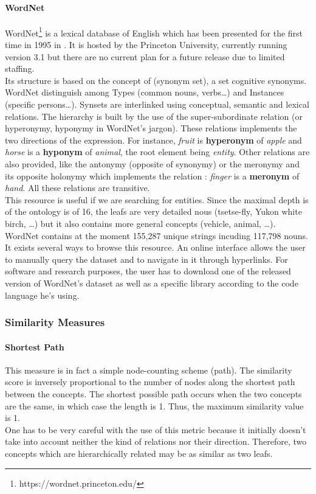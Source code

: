 \paragraph{WordNet} %
\label{par:wordnet}
WordNet\footnote{https://wordnet.princeton.edu/} is a lexical database of English which has been presented for the first time in 1995 in \cite{miller2}. It is hosted by the Princeton University, currently running version 3.1 but there are no current plan for a future release due to limited staffing.\\
Its structure is based on the concept of  (synonym set), a set cognitive synonyms. WordNet distinguish among Types (common nouns, verbs\dots) and Instances (specific persons\dots). Synsets are interlinked using conceptual, semantic and lexical relations. The hierarchy is built by the use of the super-subordinate relation (or hyperonymy, hyponymy in WordNet's jargon). These relations implements the two directions of the  expression. For instance, \textit{fruit} is \textbf{hyperonym} of \textit{apple} and \textit{horse} is a \textbf{hyponym} of \textit{animal}, the root element being \emph{entity}. Other relations are also provided, like the antonymy (opposite of synonymy) or the meronymy and its opposite holonymy which implements the  relation : \textit{finger} is a \textbf{meronym} of \textit{hand}. All these relations are transitive.\\
This resource is useful if we are searching for entities. Since the maximal depth is of the ontology is of 16, the leafs are very detailed nous (tsetse-fly, Yukon white birch, \dots) but it also contains more general concepts (vehicle, animal, \dots). WordNet contains at the moment 155,287 unique strings incuding 117,798 nouns.\\ 
It exists several ways to browse this resource. An online interface allows the user to manually query the dataset and to navigate in it through hyperlinks. For software and research purposes, the user has to download one of the released version of WordNet's dataset as well as a specific library according to the code language he's using.

\subsubsection{Similarity Measures} %
\label{ssub:similarity_measures}
\paragraph{Shortest Path} %
\label{par:shortest_path}
This measure is in fact a simple node-counting scheme (path). The similarity score is inversely proportional to the number of nodes along the shortest path between the concepts. The shortest possible path occurs when the two concepts are the same, in which case the length is 1. Thus, the maximum similarity value is 1.\\
One has to be very careful with the use of this metric because it initially doesn't take into account neither the kind of relations nor their direction. Therefore, two concepts which are hierarchically related may be as similar as two leafs.
